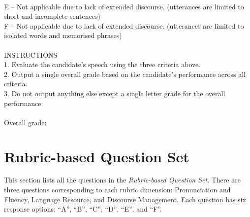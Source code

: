 \documentclass{report}
\begin{document}
\begin{tcolorbox}[breakable, colback=white, colframe=black, title=Direct Scoring Prompt]
\\E -- Not applicable due to lack of extended discourse. (utterances are limited to short and incomplete sentences)
\\F -- Not applicable due to lack of extended discourse. (utterances are limited to isolated words and memorised phrases)
\\\\
INSTRUCTIONS
\\1. Evaluate the candidate's speech using the three criteria above.
\\2. Output a single overall grade based on the candidate's performance across all criteria.
\\3. Do not output anything else except a single letter grade for the overall performance.
\\\\
Overall grade:
\end{tcolorbox}
\endgroup

\section{Rubric-based Question Set}
\label{app_sec:rubric_based_question_set}
This section lists all the questions in the \emph{Rubric-based Question Set}. There are three questions corresponding to each rubric dimension: Pronunciation and Fluency, Language Resource, and Discourse Management. Each question has six response options: ``A'', ``B'', ``C'', ``D'', ``E'', and ``F''.
\end{document}
